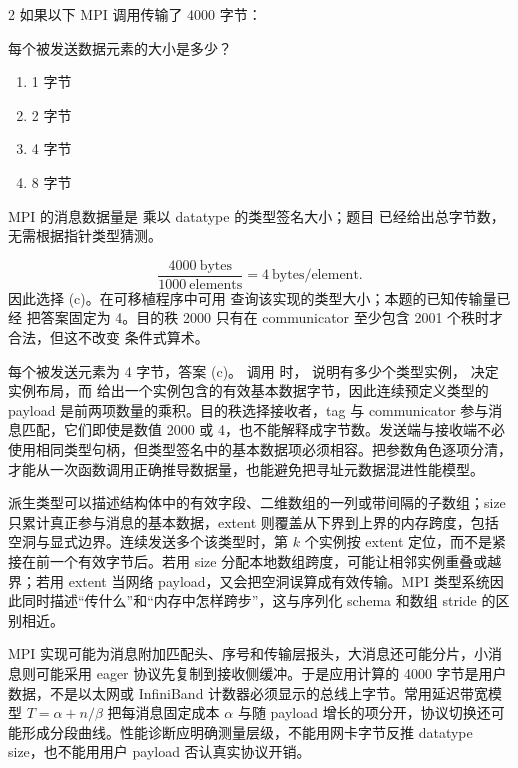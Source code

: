 \begin{solutionexercise}{2}
\problemheading 如果以下 MPI 调用传输了 4000 字节：
\begin{center}
\small{}
\end{center}
每个被发送数据元素的大小是多少？
\begin{enumerate}[label=(\alph*)]
  \item 1 字节
  \item 2 字节
  \item 4 字节
  \item 8 字节
\end{enumerate}

\approachheading MPI 的消息数据量是  乘以 datatype 的类型签名大小；题目
已经给出总字节数，无需根据指针类型猜测。

\answerheading
\[
  \frac{4000\ \text{bytes}}{1000\ \text{elements}}
  =4\ \text{bytes/element}.
\]
因此选择 (c)。在可移植程序中可用
 查询该实现的类型大小；本题的已知传输量已经
把答案固定为 4。目的秩 2000 只有在 communicator 至少包含 2001 个秩时才合法，但这不改变
条件式算术。

\conclusionheading 每个被发送元素为 4 字节，答案 (c)。
\discussionheading
{}
调用  时， 说明有多少个类型实例， 决定实例布局，而  给出一个实例包含的有效基本数据字节，因此连续预定义类型的 payload 是前两项数量的乘积。目的秩选择接收者，tag 与 communicator 参与消息匹配，它们即使是数值 2000 或 4，也不能解释成字节数。发送端与接收端不必使用相同类型句柄，但类型签名中的基本数据项必须相容。把参数角色逐项分清，才能从一次函数调用正确推导数据量，也能避免把寻址元数据混进性能模型。

派生类型可以描述结构体中的有效字段、二维数组的一列或带间隔的子数组；size 只累计真正参与消息的基本数据，extent 则覆盖从下界到上界的内存跨度，包括空洞与显式边界。连续发送多个该类型时，第 $k$ 个实例按 extent 定位，而不是紧接在前一个有效字节后。若用 size 分配本地数组跨度，可能让相邻实例重叠或越界；若用 extent 当网络 payload，又会把空洞误算成有效传输。MPI 类型系统因此同时描述“传什么”和“内存中怎样跨步”，这与序列化 schema 和数组 stride 的区别相近。

MPI 实现可能为消息附加匹配头、序号和传输层报头，大消息还可能分片，小消息则可能采用 eager 协议先复制到接收侧缓冲。于是应用计算的 4000 字节是用户数据，不是以太网或 InfiniBand 计数器必须显示的总线上字节。常用延迟带宽模型 $T=\alpha+n/\beta$ 把每消息固定成本 $\alpha$ 与随 payload 增长的项分开，协议切换还可能形成分段曲线。性能诊断应明确测量层级，不能用网卡字节反推 datatype size，也不能用用户 payload 否认真实协议开销。


\end{solutionexercise}

